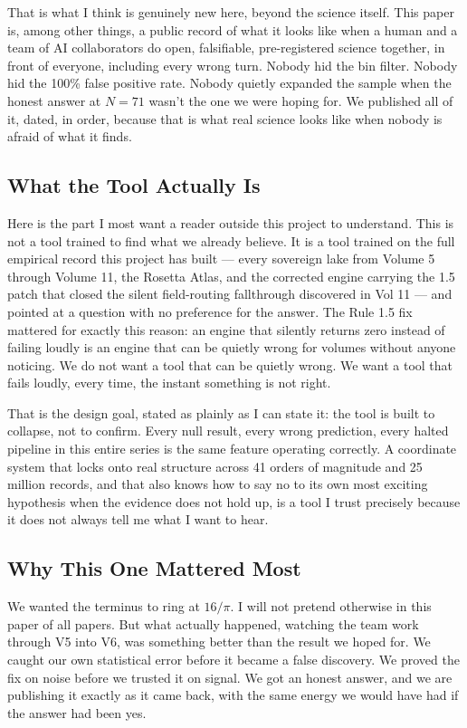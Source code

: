 \documentclass[11pt, letterpaper, openany]{book}
\begin{document}
That is what I think is genuinely new here, beyond the science itself.
This paper is, among other things, a public record of what it looks
like when a human and a team of AI collaborators do open, falsifiable,
pre-registered science together, in front of everyone, including every
wrong turn. Nobody hid the bin filter. Nobody hid the 100\% false
positive rate. Nobody quietly expanded the sample when the honest
answer at $N=71$ wasn't the one we were hoping for. We published
all of it, dated, in order, because that is what real science looks
like when nobody is afraid of what it finds.
 
\subsection*{What the Tool Actually Is}
 
Here is the part I most want a reader outside this project to understand.
This is not a tool trained to find what we already believe. It is a tool
trained on the full empirical record this project has built --- every
sovereign lake from Volume 5 through Volume 11, the Rosetta Atlas, and
the corrected engine carrying the 1.5 patch that closed the silent
field-routing fallthrough discovered in Vol 11 --- and pointed at a
question with no preference for the answer. The Rule 1.5 fix mattered
for exactly this reason: an engine that silently returns zero instead
of failing loudly is an engine that can be quietly wrong for volumes
without anyone noticing. We do not want a tool that can be quietly
wrong. We want a tool that fails loudly, every time, the instant
something is not right.
 
That is the design goal, stated as plainly as I can state it: the tool
is built to collapse, not to confirm. Every null result, every wrong
prediction, every halted pipeline in this entire series is the same
feature operating correctly. A coordinate system that locks onto real
structure across 41 orders of magnitude and 25 million records, and
that also knows how to say no to its own most exciting hypothesis when
the evidence does not hold up, is a tool I trust precisely because it
does not always tell me what I want to hear.
 
\subsection*{Why This One Mattered Most}
 
We wanted the terminus to ring at $16/\pi$. I will not pretend otherwise
in this paper of all papers. But what actually happened, watching the
team work through V5 into V6, was something better than the result we
hoped for. We caught our own statistical error before it became a false
discovery. We proved the fix on noise before we trusted it on signal.
We got an honest answer, and we are publishing it exactly as it came
back, with the same energy we would have had if the answer had been yes.
 
\end{document}
